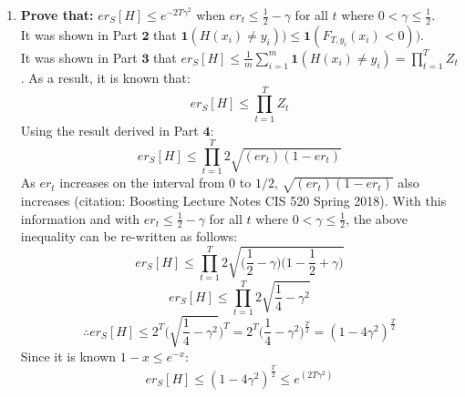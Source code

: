 \documentclass[english]{article}
\begin{document}
\begin{enumerate}
    \item \textbf{Prove that:} $er_S[H] \leq e^{-2T\gamma^2}$ when $er_t \leq \frac{1}{2} - \gamma$ for all $t$ where $0 < \gamma \leq \frac{1}{2}$. \\
    It was shown in Part $\mathbf{2}$ that $\textbf{1}(H(x_i) \neq y_i)) \leq \textbf{1}(F_{T,y_i}(x_i) < 0))$. \\
    It was shown in Part $\mathbf{3}$ that $er_S[H] \leq \frac{1}{m} \sum_{i=1}^{m}\textbf{1}(H(x_i) \neq y_i) = \prod_{t=1}^{T} Z_t$. 
    As a result, it is known that:
     $$er_S[H]  \leq \prod_{t=1}^T Z_t$$ 
     Using the result derived in Part $\mathbf{4}$: 
     $$er_S[H]  \leq \prod_{t=1}^T 2\sqrt{(er_t)(1 - er_t)}$$ 
     As $er_t$ increases on the interval from $0$ to $1/2$, $\sqrt{(er_t)(1 - er_t)}$ also increases (citation: Boosting Lecture Notes CIS 520 Spring 2018). With this information and with $er_t \leq \frac{1}{2} - \gamma$ for all $t$ where $0 < \gamma \leq \frac{1}{2}$, the above inequality can be re-written as follows: 
    $$er_S[H] \leq \prod_{t=1}^T 2\sqrt{\bigg(\frac{1}{2} - \gamma\bigg)\bigg(1 - \frac{1}{2} + \gamma\bigg)}$$
    $$er_S[H] \leq \prod_{t=1}^T 2\sqrt{\frac{1}{4} - \gamma^2}$$
    $$\therefore er_S[H] \leq 2^T\bigg(\sqrt{\frac{1}{4} - \gamma^2}\bigg)^T = 2^T\bigg(\frac{1}{4} - \gamma^2\bigg)^{\frac{T}{2}} = (1 - 4\gamma^2)^{\frac{T}{2}}$$
    Since it is known $1 - x \leq e^{-x}$: 
    $$er_S[H] \leq (1 - 4\gamma^2)^{\frac{T}{2}} \leq e^{(2T\gamma^2)}$$ 
     
\end{enumerate}

\newpage
\end{document}

